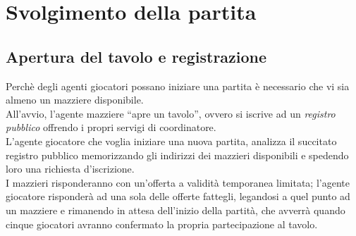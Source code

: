 \section{Svolgimento della partita}

\subsection{Apertura del tavolo e registrazione}
Perchè degli agenti giocatori possano iniziare una partita è necessario che vi sia almeno un mazziere disponibile.\\
All'avvio, l'agente mazziere ``apre un tavolo'', ovvero si iscrive ad un \emph{registro pubblico} offrendo i propri servigi di coordinatore.\\
L'agente giocatore che voglia iniziare una nuova partita, analizza il succitato registro pubblico memorizzando gli indirizzi dei mazzieri disponibili e spedendo loro una richiesta d'iscrizione.\\
I mazzieri risponderanno con un'offerta a validità temporanea limitata; l'agente giocatore risponderà ad una sola delle offerte fattegli, legandosi a quel punto ad un mazziere e rimanendo in attesa dell'inizio della partità, che avverrà quando cinque giocatori avranno confermato la propria partecipazione al tavolo.\\

